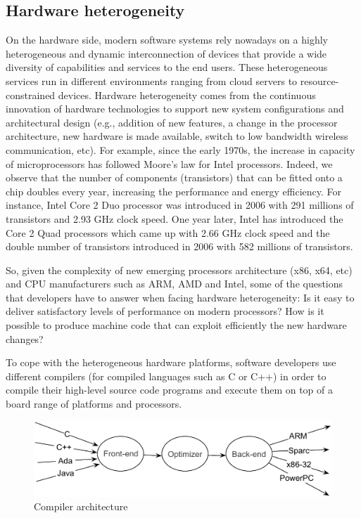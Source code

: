 

\subsection{Hardware heterogeneity}
On the hardware side, modern software systems rely nowadays on a highly heterogeneous and dynamic interconnection of devices that provide a wide diversity of capabilities and services to the end users.
These heterogeneous services run in different environments ranging from cloud servers to resource-constrained devices.
Hardware heterogeneity comes from the continuous innovation of hardware technologies to support new system configurations and architectural design (e.g., addition of new features, a change in the processor architecture, new hardware is made available, switch to low bandwidth wireless communication, etc). 
For example, since the early 1970s, the increase in capacity of microprocessors has followed Moore's law for Intel processors. Indeed, we observe that the number of components (transistors) that can be fitted onto a chip doubles every year, increasing the performance and energy efficiency.
For instance, Intel Core 2 Duo processor was introduced in 2006 with 291 millions of transistors and 2.93 GHz clock speed. One year later, Intel has introduced the Core 2 Quad processors which came up with 2.66 GHz clock speed and the double number of transistors introduced in 2006 with 582 millions of transistors.

So, given the complexity of new emerging processors architecture (x86, x64, etc) and CPU manufacturers such as ARM, AMD and Intel, some of the questions that developers have to answer when facing hardware heterogeneity: 
Is it easy to deliver satisfactory levels of performance on modern processors? How is it possible to produce machine code that can exploit efficiently the new hardware changes? 

To cope with the heterogeneous hardware platforms, software developers use different compilers (for compiled languages such as C or C++) in order to compile their high-level source code programs and execute them on top of a board range of platforms and processors. 

\begin{figure}[h]
	\center
	\includegraphics[scale=0.65]{Background/fig/compilers}
	\caption{Compiler architecture}
\end{figure}

